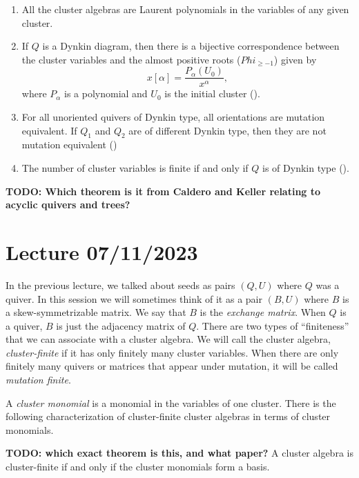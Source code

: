 \documentclass{article}
\begin{document}
\begin{theorem}
	\leavevmode
	\begin{enumerate}
		\item All the cluster algebras are Laurent polynomials in the variables of any given cluster.
		      \cite[Theorem 3.1]{FominZelivinsky2002CAF}
		\item If $Q$ is a Dynkin diagram, then there is a bijective correspondence between the
		      cluster variables and the almost positive roots ($Phi_{\geq -1}$) given by
		      \begin{equation*}
			      x[\alpha] = \frac{P_\alpha (U_0)}{x^\alpha},
		      \end{equation*}
		      where $P_\alpha$ is a polynomial and $U_0$ is the initial cluster (\cite[Theorem 1.9]{FominZelivinsky2003CAFin}).
		\item For all unoriented quivers of Dynkin type, all orientations are mutation equivalent. If
		      $Q_1$ and $Q_2$ are of different Dynkin type, then they are not mutation equivalent
		      (\cite[Theorem 1.7]{FominZelivinsky2003CAFin})
		\item The number of cluster variables is finite if and only if $Q$ is of Dynkin type
		      (\cite[Theorem 1.6]{FominZelivinsky2003CAFin}).
	\end{enumerate}
\end{theorem}

\textbf{TODO: Which theorem is it from Caldero and Keller relating to acyclic quivers and trees?}

\section{Lecture 07/11/2023}

In the previous lecture, we talked about seeds as pairs $(Q, U)$ where $Q$ was a
quiver. In this session we will sometimes think of it as a pair $(B, U)$ where $B$ is a
skew-symmetrizable matrix. We say that $B$ is the \emph{exchange matrix}. When $Q$ is a
quiver, $B$ is just the adjacency matrix of $Q$. There are two types of ``finiteness''
that we can associate with a cluster algebra. We will call the cluster algebra,
\emph{cluster-finite} if it has only finitely many cluster variables. When there are
only finitely many quivers or matrices that appear under mutation, it will be called
\emph{mutation finite}.

A \emph{cluster monomial} is a monomial in the variables of one cluster. There is the
following characterization of cluster-finite cluster algebras in terms of cluster
monomials.
\begin{theorem}
	\textbf{TODO: which exact theorem is this, and what paper?}
	A cluster algebra is cluster-finite if and only if the cluster monomials form a basis.
\end{theorem}
\end{document}
